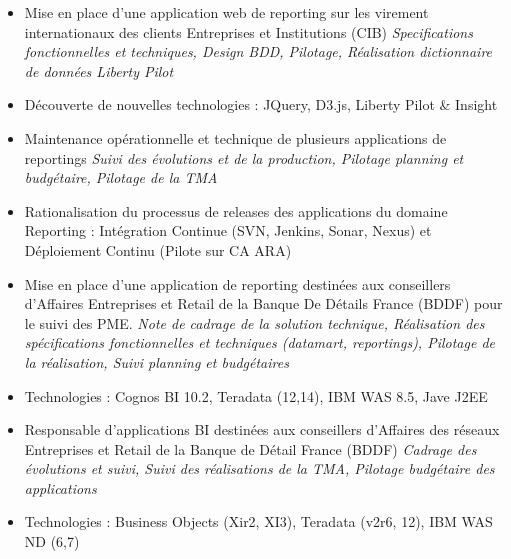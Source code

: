 \documentclass[10pt,a4paper]{moderncv}
\begin{document}
{
\begin{itemize}
 \item Mise en place d'une application web de reporting sur les virement internationaux des clients Entreprises et Institutions (CIB) \newline
	\textit{Specifications fonctionnelles et techniques, Design BDD, Pilotage, Réalisation dictionnaire de données Liberty Pilot}
 \item Découverte de nouvelles technologies : JQuery, D3.js, Liberty Pilot \& Insight 
\end{itemize}
}



{
\begin{itemize}
 \item Maintenance opérationnelle et technique de plusieurs applications de reportings \newline
 	\textit{Suivi des évolutions et de la production, Pilotage planning et budgétaire, Pilotage de la TMA}
 \item Rationalisation du processus de releases des applications du domaine Reporting : Intégration Continue (SVN, Jenkins, Sonar, Nexus) et Déploiement Continu (Pilote sur CA ARA)  
\end{itemize}
}


{
\begin{itemize}
 \item Mise en place d'une application de reporting destinées aux conseillers d'Affaires Entreprises et Retail de la Banque De Détails France (BDDF) pour le suivi des PME. \newline
   \textit{Note de cadrage de la solution technique, Réalisation des spécifications fonctionnelles et techniques (datamart, reportings), Pilotage de la réalisation, Suivi planning et budgétaires}
 \item Technologies : Cognos BI 10.2, Teradata (12,14), IBM WAS 8.5, Jave J2EE
\end{itemize}
}

{
\begin{itemize}
 \item Responsable d'applications BI destinées aux conseillers d'Affaires des réseaux Entreprises et Retail de la Banque de Détail France (BDDF) \newline
	\textit{Cadrage des évolutions et suivi, Suivi des réalisations de la TMA, Pilotage budgétaire des applications}
 \item Technologies : Business Objects (Xir2, XI3), Teradata (v2r6, 12), IBM WAS ND (6,7)
\end{itemize}
}
\end{document}
